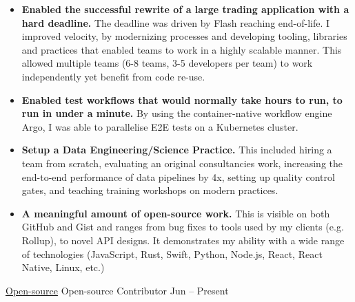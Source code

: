 \documentclass[10pt,a4paper]{article}
\begin{document}
\begin{indentsection}
\item
\begin{itemize}[leftmargin=0cm]

    \item \textbf{Enabled the successful rewrite of a large trading application with a hard deadline.} The deadline was driven by Flash reaching end-of-life. I improved velocity, by modernizing processes and developing tooling, libraries and practices that enabled teams to work in a highly scalable manner. This allowed multiple teams (6-8 teams, 3-5 developers per team) to work independently yet benefit from code re-use.

    \item \textbf{Enabled test workflows that would normally take hours to run, to run in under a minute.} By using the container-native workflow engine Argo, I was able to parallelise E2E tests on a Kubernetes cluster.

    \item \textbf{Setup a Data Engineering/Science Practice.} This included hiring a team from scratch, evaluating an original consultancies work, increasing the end-to-end performance of data pipelines by 4x, setting up quality control gates, and teaching training workshops on modern practices.

    \item \textbf{A meaningful amount of open-source work.} This is visible on both GitHub and Gist and ranges from bug fixes to tools used by my clients (e.g. Rollup), to novel API designs. It demonstrates my ability with a wide range of technologies (JavaScript, Rust, Swift, Python, Node.js, React, React Native, Linux, etc.)

\end{itemize}
\end{indentsection}


\headedsection  %
  {\href{http://github.com/sebinsua}{Open-source}}
  {} {%
  \headedsubsection  %
    {Open-source Contributor}
    {Jun  -- Present}
    {}
}
\end{document}
